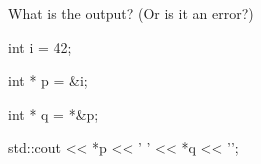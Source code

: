 What is the output? (Or is it an error?)



\begin{consolethree}[escapeinside=||]

int i = 42;

int * p = &i;

int * q = *&p;



std::cout << *p << ' ' << *q << '\n'; 

\end{consolethree}

